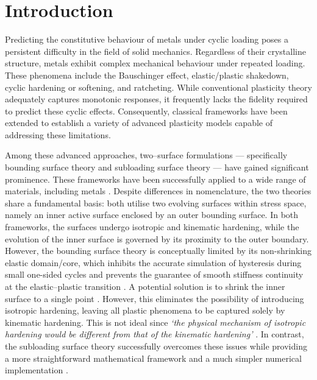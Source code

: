 \section{Introduction}
Predicting the constitutive behaviour of metals under cyclic loading poses a persistent difficulty in the field of solid mechanics.
Regardless of their crystalline structure, metals exhibit complex mechanical behaviour under repeated loading.
These phenomena \citep{Suresh1998} include the Bauschinger effect, elastic/plastic shakedown, cyclic hardening or softening, and ratcheting.
While conventional plasticity theory \citep[see][]{Simo1998} adequately captures monotonic responses, it frequently lacks the fidelity required to predict these cyclic effects.
Consequently, classical frameworks have been extended to establish a variety of advanced plasticity models capable of addressing these limitations.

Among these advanced approaches, two--surface formulations --- specifically bounding surface theory \citep{Dafalias1975,Krieg1975} and subloading surface theory \citep{Hashiguchi1980,Hashiguchi1989,Hashiguchi2023a,Hashiguchi2024} --- have gained significant prominence.
These frameworks have been successfully applied to a wide range of materials, including metals \citep[e.g.,][]{Yoshida2002,Mahan2011}.
Despite differences in nomenclature, the two theories share a fundamental basis: both utilise two evolving surfaces within stress space, namely an inner active surface enclosed by an outer bounding surface.
In both frameworks, the surfaces undergo isotropic and kinematic hardening, while the evolution of the inner surface is governed by its proximity to the outer boundary.
However, the bounding surface theory \citep{Dafalias1975,Mahan2011} is conceptually limited by its non-shrinking elastic domain/core, which inhibits the accurate simulation of hysteresis during small one-sided cycles and prevents the guarantee of smooth stiffness continuity at the elastic--plastic transition \citep[][see \S 8.2.3]{Hashiguchi2017}.
A potential solution is to shrink the inner surface to a single point \citep{Dafalias1977}. However, this eliminates the possibility of introducing isotropic hardening, leaving all plastic phenomena to be captured solely by kinematic hardening. This is not ideal since \textit{`the physical mechanism of isotropic hardening would be different from that of the kinematic hardening'} \citep[see][\S~2.5]{Hashiguchi2024}.
In contrast, the subloading surface theory successfully overcomes these issues while providing a more straightforward mathematical framework and a much simpler numerical implementation \citep{Chang2025}.

